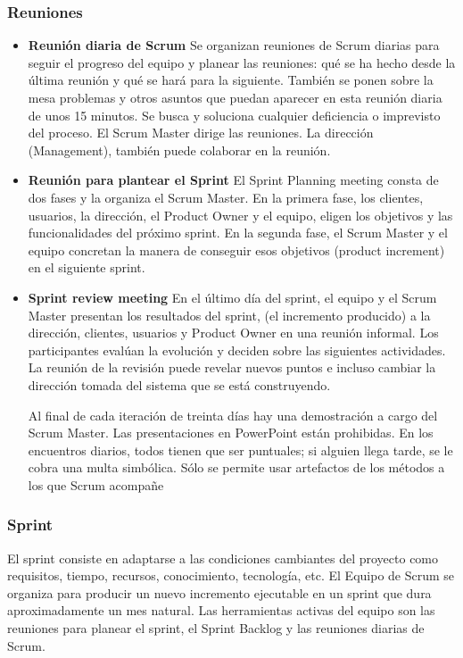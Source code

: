 \subsubsection{Reuniones}
\begin{itemize}
\item \textbf{Reunión diaria de Scrum} Se organizan reuniones de Scrum diarias para seguir el progreso del equipo y planear las reuniones: qué se ha hecho desde la última reunión y qué se hará para la siguiente. También se ponen sobre la mesa problemas y otros asuntos que puedan aparecer en esta reunión diaria de unos 15 minutos. Se busca y soluciona cualquier deficiencia o imprevisto del proceso. El Scrum Master dirige las reuniones. La dirección (Management), también puede colaborar en la reunión.

\item \textbf{Reunión para plantear el Sprint} El Sprint Planning meeting consta de dos fases y la organiza el Scrum Master. En la primera fase, los clientes, usuarios, la dirección, el Product Owner y el equipo, eligen los objetivos y las funcionalidades del próximo sprint. En la segunda fase, el Scrum Master y el equipo concretan la manera de conseguir esos objetivos (product increment) en el siguiente sprint.

\item \textbf{Sprint review meeting} En el último día del sprint, el equipo y el Scrum Master presentan los resultados del sprint, (el incremento producido) a la dirección, clientes, usuarios y Product Owner en una reunión informal. Los participantes evalúan la evolución y deciden sobre las siguientes actividades. La reunión de la revisión puede revelar nuevos puntos e incluso cambiar la dirección tomada del sistema que se está construyendo.

Al final de cada iteración de treinta días hay una demostración a cargo del Scrum Master. Las presentaciones en PowerPoint están prohibidas. En los encuentros diarios, todos tienen que ser puntuales; si alguien llega tarde, se le cobra una multa simbólica. Sólo se permite usar artefactos de los métodos a los que Scrum acompañe

\end{itemize}
\subsubsection{Sprint}
El sprint consiste en adaptarse a las condiciones cambiantes del proyecto como requisitos, tiempo, recursos, conocimiento, tecnología, etc. El Equipo de Scrum se organiza para producir un nuevo incremento ejecutable en un sprint que dura aproximadamente un mes natural. Las herramientas activas del equipo son las reuniones para planear el sprint, el Sprint Backlog y las reuniones diarias de Scrum.

